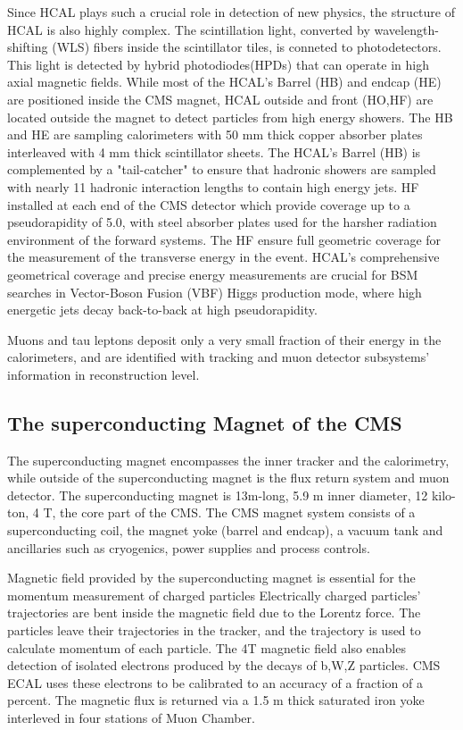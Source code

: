 Since HCAL plays such a crucial role in detection of new physics, the structure of HCAL is also highly complex. 
The scintillation light, converted by wavelength-shifting (WLS) fibers inside the scintillator tiles, is conneted to photodetectors. 
This light is detected by hybrid photodiodes(HPDs) that can operate in high axial magnetic fields.
While most of the HCAL's Barrel (HB) and endcap (HE) are positioned inside the CMS magnet, HCAL outside and front (HO,HF) are located outside the magnet to detect particles from high energy showers.
The HB and HE are sampling calorimeters with 50 mm thick copper absorber plates interleaved with 4 mm thick scintillator sheets. 
The HCAL's Barrel (HB) is complemented by a "tail-catcher" to ensure that hadronic showers are sampled with nearly 11 hadronic interaction lengths to contain high energy jets. 
HF installed at each end of the CMS detector which provide coverage up to a pseudorapidity of 5.0, with steel absorber plates used for the harsher radiation environment of the forward systems.
The HF ensure full geometric coverage for the measurement of the transverse energy in the event.
HCAL's comprehensive geometrical coverage and precise energy measurements are crucial for BSM searches in Vector-Boson Fusion (VBF) Higgs production mode, where high energetic jets decay back-to-back at high pseudorapidity.

Muons and tau leptons deposit only a very small fraction of their energy in the calorimeters, and are identified with tracking and muon detector subsystems' information in reconstruction level. 
\subsection{The superconducting Magnet  of the CMS}

The superconducting magnet encompasses the inner tracker and the calorimetry, while outside of the superconducting magnet is the flux return system and muon detector.
The superconducting magnet is 13m-long, 5.9 m inner diameter, 12 kilo-ton, 4 T, the core part of the CMS. 
The CMS magnet system consists of a superconducting coil, the magnet yoke (barrel and endcap), a vacuum tank and ancillaries such as cryogenics, power supplies and process controls. 

Magnetic field provided by the superconducting magnet is essential for the momentum measurement of charged particles
Electrically charged particles' trajectories are bent inside the magnetic field due to the Lorentz force.
The particles leave their trajectories in the tracker, and the trajectory is used to calculate momentum of each particle.
The 4T magnetic field also enables detection of isolated electrons produced by the decays of b,W,Z particles. 
CMS ECAL uses these electrons to be calibrated to an accuracy of a fraction of a percent.
The magnetic flux is returned via a 1.5 m thick saturated iron yoke interleved in four stations of Muon Chamber.
